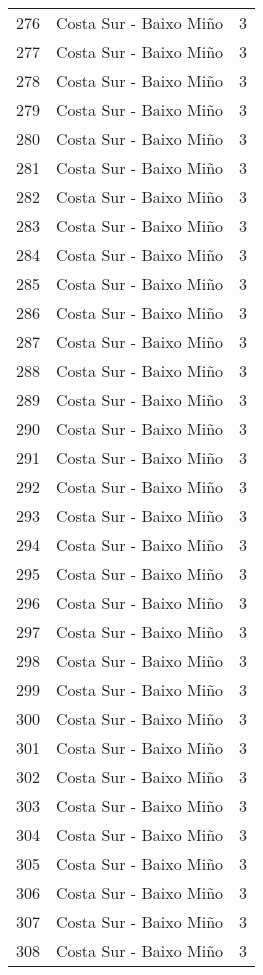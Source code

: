 \begin{table}[p]
\begin{tabular}{rlr}
  276 & Costa Sur - Baixo Miño &   3 \\ 
  277 & Costa Sur - Baixo Miño &   3 \\ 
  278 & Costa Sur - Baixo Miño &   3 \\ 
  279 & Costa Sur - Baixo Miño &   3 \\ 
  280 & Costa Sur - Baixo Miño &   3 \\ 
  281 & Costa Sur - Baixo Miño &   3 \\ 
  282 & Costa Sur - Baixo Miño &   3 \\ 
  283 & Costa Sur - Baixo Miño &   3 \\ 
  284 & Costa Sur - Baixo Miño &   3 \\ 
  285 & Costa Sur - Baixo Miño &   3 \\ 
  286 & Costa Sur - Baixo Miño &   3 \\ 
  287 & Costa Sur - Baixo Miño &   3 \\ 
  288 & Costa Sur - Baixo Miño &   3 \\ 
  289 & Costa Sur - Baixo Miño &   3 \\ 
  290 & Costa Sur - Baixo Miño &   3 \\ 
  291 & Costa Sur - Baixo Miño &   3 \\ 
  292 & Costa Sur - Baixo Miño &   3 \\ 
  293 & Costa Sur - Baixo Miño &   3 \\ 
  294 & Costa Sur - Baixo Miño &   3 \\ 
  295 & Costa Sur - Baixo Miño &   3 \\ 
  296 & Costa Sur - Baixo Miño &   3 \\ 
  297 & Costa Sur - Baixo Miño &   3 \\ 
  298 & Costa Sur - Baixo Miño &   3 \\ 
  299 & Costa Sur - Baixo Miño &   3 \\ 
  300 & Costa Sur - Baixo Miño &   3 \\ 
  301 & Costa Sur - Baixo Miño &   3 \\ 
  302 & Costa Sur - Baixo Miño &   3 \\ 
  303 & Costa Sur - Baixo Miño &   3 \\ 
  304 & Costa Sur - Baixo Miño &   3 \\ 
  305 & Costa Sur - Baixo Miño &   3 \\ 
  306 & Costa Sur - Baixo Miño &   3 \\ 
  307 & Costa Sur - Baixo Miño &   3 \\ 
  308 & Costa Sur - Baixo Miño &   3 \\ 

\end{tabular}
\end{table}
